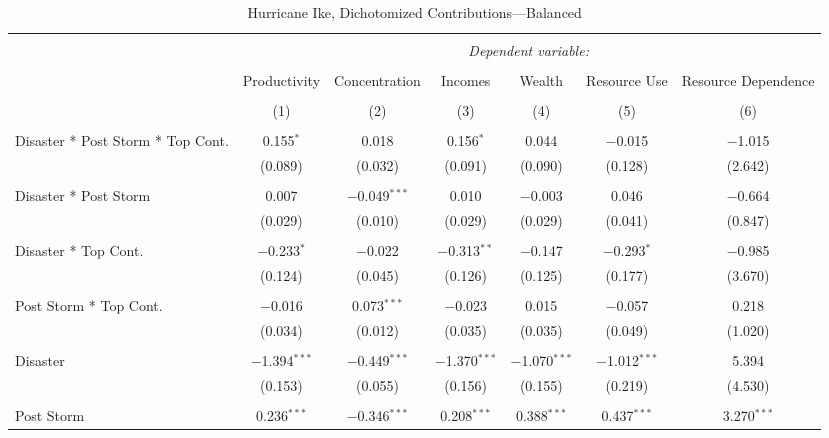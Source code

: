 
\begin{table}[!htbp] \centering 
  \caption{Hurricane Ike, Dichotomized Contributions---Balanced} 
  \label{} 
\footnotesize 
\begin{tabular}{@{\extracolsep{5pt}}lcccccc} 
\\[-1.8ex]\hline 
\hline \\[-1.8ex] 
 & \multicolumn{6}{c}{\textit{Dependent variable:}} \\ 
\cline{2-7} 
\\[-1.8ex] & Productivity & Concentration & Incomes & Wealth & Resource Use & Resource Dependence \\ 
\\[-1.8ex] & (1) & (2) & (3) & (4) & (5) & (6)\\ 
\hline \\[-1.8ex] 
 Disaster * Post Storm * Top Cont. & 0.155$^{*}$ & 0.018 & 0.156$^{*}$ & 0.044 & $-$0.015 & $-$1.015 \\ 
  & (0.089) & (0.032) & (0.091) & (0.090) & (0.128) & (2.642) \\ 
  & & & & & & \\ 
 Disaster * Post Storm & 0.007 & $-$0.049$^{***}$ & 0.010 & $-$0.003 & 0.046 & $-$0.664 \\ 
  & (0.029) & (0.010) & (0.029) & (0.029) & (0.041) & (0.847) \\ 
  & & & & & & \\ 
 Disaster * Top Cont. & $-$0.233$^{*}$ & $-$0.022 & $-$0.313$^{**}$ & $-$0.147 & $-$0.293$^{*}$ & $-$0.985 \\ 
  & (0.124) & (0.045) & (0.126) & (0.125) & (0.177) & (3.670) \\ 
  & & & & & & \\ 
 Post Storm *  Top Cont. & $-$0.016 & 0.073$^{***}$ & $-$0.023 & 0.015 & $-$0.057 & 0.218 \\ 
  & (0.034) & (0.012) & (0.035) & (0.035) & (0.049) & (1.020) \\ 
  & & & & & & \\ 
 Disaster & $-$1.394$^{***}$ & $-$0.449$^{***}$ & $-$1.370$^{***}$ & $-$1.070$^{***}$ & $-$1.012$^{***}$ & 5.394 \\ 
  & (0.153) & (0.055) & (0.156) & (0.155) & (0.219) & (4.530) \\ 
  & & & & & & \\ 
 Post Storm & 0.236$^{***}$ & $-$0.346$^{***}$ & 0.208$^{***}$ & 0.388$^{***}$ & 0.437$^{***}$ & 3.270$^{***}$ \\ 

\end{tabular}
\end{table}
